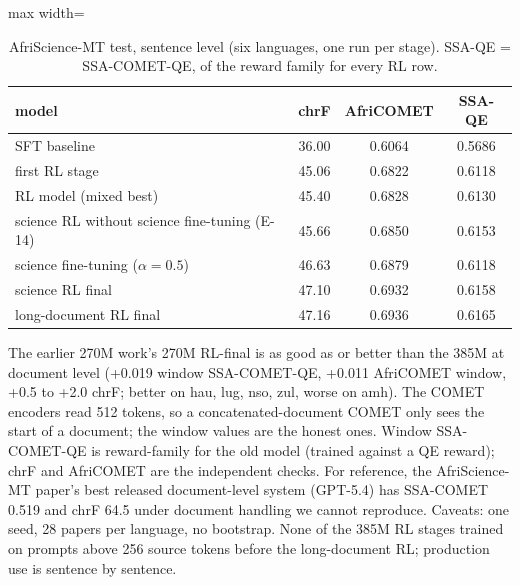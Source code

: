 \begin{table}[htbp]
\centering\small
\caption{AfriScience-MT test, sentence level (six languages, one run per stage). SSA-QE = SSA-COMET-QE, of the reward family for every RL row.}\label{tab:sci_full}
\begin{adjustbox}{max width=\linewidth}\begin{tabular}{@{}lccc@{}}
\toprule
model & chrF & AfriCOMET & SSA-QE\\
\midrule
SFT baseline & 36.00 & 0.6064 & 0.5686\\
first RL stage & 45.06 & 0.6822 & 0.6118\\
RL model (mixed best) & 45.40 & 0.6828 & 0.6130\\
science RL without science fine-tuning (E-14) & 45.66 & 0.6850 & 0.6153\\
science fine-tuning ($\alpha=0.5$) & 46.63 & 0.6879 & 0.6118\\
science RL final & 47.10 & 0.6932 & 0.6158\\
long-document RL final & 47.16 & 0.6936 & 0.6165\\
\bottomrule
\end{tabular}\end{adjustbox}
\end{table}

The earlier 270M work's 270M RL-final is as good as or better than the 385M at document level (+0.019 window SSA-COMET-QE, +0.011 AfriCOMET window, +0.5 to +2.0 chrF; better on hau, lug, nso, zul, worse on amh). The COMET encoders read 512 tokens, so a concatenated-document COMET only sees the start of a document; the window values are the honest ones. Window SSA-COMET-QE is reward-family for the old model (trained against a QE reward); chrF and AfriCOMET are the independent checks. For reference, the AfriScience-MT paper's best released document-level system (GPT-5.4) has SSA-COMET 0.519 and chrF 64.5 under document handling we cannot reproduce. Caveats: one seed, 28 papers per language, no bootstrap. None of the 385M RL stages trained on prompts above 256 source tokens before the long-document RL; production use is sentence by sentence.

